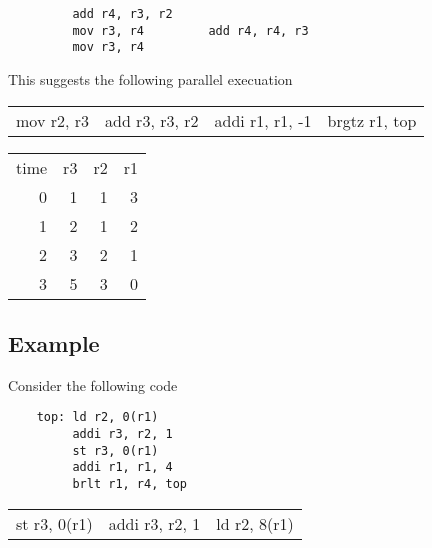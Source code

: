 \begin{verbatim}
         add r4, r3, r2
         mov r3, r4         add r4, r4, r3
         mov r3, r4
\end{verbatim}

This suggests the following parallel execuation

\begin{tabular}{llll}
mov r2, r3  & add r3, r3, r2 & addi r1, r1, -1 & brgtz r1, top \\
\end{tabular}



\begin{tabular}{rrrr}
time  &r3      & r2   & r1  \\
0     & 1      & 1    & 3   \\
1     & 2      & 1    & 2  \\
2     & 3      & 2    & 1 \\
3     & 5      & 3    & 0 \\
\end{tabular}


\subsection{Example}
Consider the following code

\begin{verbatim}
    top: ld r2, 0(r1)
         addi r3, r2, 1
         st r3, 0(r1)
         addi r1, r1, 4
         brlt r1, r4, top
\end{verbatim}

\begin{tabular}{lll}
st r3, 0(r1) & addi r3, r2, 1 & ld r2, 8(r1) \\
\end{tabular} 